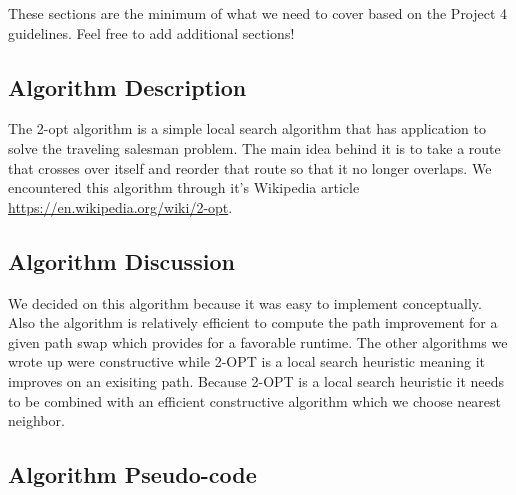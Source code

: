 \documentclass[../report/main.tex]{subfiles}
\begin{document}
These sections are the minimum of what we need to cover based on the Project 4 guidelines. Feel free to add additional sections!

\subsection*{Algorithm Description}

The 2-opt algorithm is a simple local search algorithm that has application to solve the traveling salesman problem. The main idea behind it is to take a route that crosses over itself and reorder that route so that it no longer overlaps. We encountered this algorithm through it's Wikipedia article \url{https://en.wikipedia.org/wiki/2-opt}.

\subsection*{Algorithm Discussion}

We decided on this algorithm because it was easy to implement conceptually. Also the algorithm is relatively efficient to compute the path improvement for a given path swap which provides for a favorable runtime. The other algorithms we wrote up were constructive while 2-OPT is a local search heuristic meaning it improves on an exisiting path. Because 2-OPT is a local search heuristic it needs to be combined with an efficient constructive algorithm which we choose nearest neighbor.

\subsection*{Algorithm Pseudo-code}
\end{document}
